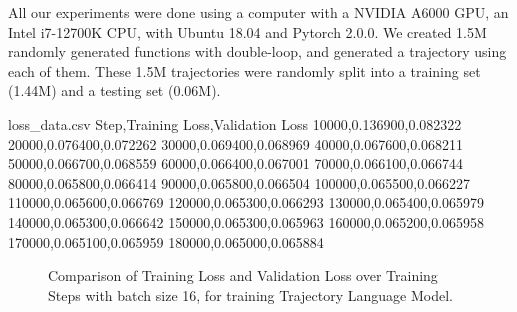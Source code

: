 \documentclass[pdflatex,sn-mathphys-num]{sn-jnl}%
\theoremstyle{thmstyleone}%
\theoremstyle{thmstyletwo}%
\theoremstyle{thmstylethree}%
\begin{document}
All our experiments were done using a computer with a NVIDIA A6000 GPU, an Intel i7-12700K CPU, with Ubuntu 18.04 and Pytorch 2.0.0. We created 1.5M randomly generated functions with double-loop, and generated a trajectory using each of them. These 1.5M trajectories were randomly split into a training set (1.44M) and a testing set (0.06M). 


\begin{filecontents*}{loss_data.csv}
Step,Training Loss,Validation Loss
10000,0.136900,0.082322
20000,0.076400,0.072262
30000,0.069400,0.068969
40000,0.067600,0.068211
50000,0.066700,0.068559
60000,0.066400,0.067001
70000,0.066100,0.066744
80000,0.065800,0.066414
90000,0.065800,0.066504
100000,0.065500,0.066227
110000,0.065600,0.066769
120000,0.065300,0.066293
130000,0.065400,0.065979
140000,0.065300,0.066642
150000,0.065300,0.065963
160000,0.065200,0.065958
170000,0.065100,0.065959
180000,0.065000,0.065884
\end{filecontents*}

\begin{figure}[htbp]
    \centering
\caption{Comparison of Training Loss and Validation Loss over Training Steps with batch size 16, for training Trajectory Language Model.}
    \label{fig:loss_plot}
\end{figure}
\end{document}

